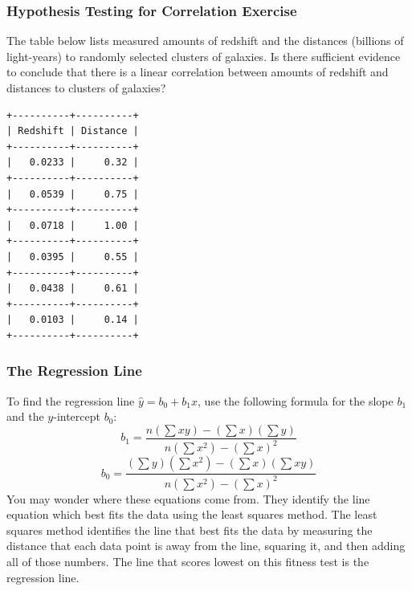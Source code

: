 \documentclass[xcolor=dvipsnames]{beamer}
\begin{document}
\begin{frame}[fragile]
  \frametitle{Hypothesis Testing for Correlation Exercise}
  {\ubung} The table below lists measured amounts of redshift and
  the distances (billions of light-years) to randomly selected
  clusters of galaxies. Is there sufficient evidence to conclude
  that there is a linear correlation between amounts of redshift
  and distances to clusters of galaxies?
  \begin{footnotesize}
\begin{verbatim}
+----------+----------+
| Redshift | Distance |
+----------+----------+
|   0.0233 |     0.32 |
+----------+----------+
|   0.0539 |     0.75 |
+----------+----------+
|   0.0718 |     1.00 |
+----------+----------+
|   0.0395 |     0.55 |
+----------+----------+
|   0.0438 |     0.61 |
+----------+----------+
|   0.0103 |     0.14 |
+----------+----------+
\end{verbatim}
  \end{footnotesize}
\end{frame}

\begin{frame}
  \frametitle{The Regression Line}
  To find the regression line $\hat{y}=b_{0}+b_{1}x$, use the
  following formula for the slope $b_{1}$ and the $y$-intercept
  $b_{0}$:
  \begin{equation}
    \label{eq:ohzashur}
    b_{1}=\frac{n\left(\sum{}xy\right)-\left(\sum{}x\right)\left(\sum{}y\right)}{n\left(\sum{}x^{2}\right)-\left(\sum{}x\right)^{2}}
  \end{equation}
  \begin{equation}
    \label{eq:xuothaba}
    b_{0}=\frac{\left(\sum{}y\right)\left(\sum{}x^{2}\right)-\left(\sum{}x\right)\left(\sum{}xy\right)}{n\left(\sum{}x^{2}\right)-\left(\sum{}x\right)^{2}}
  \end{equation}
 You may wonder where these equations come from. They identify the
 line equation which best fits the data using the \alert{least
   squares} method. The least squares method identifies the line
 that best fits the data by measuring the distance that each data
 point is away from the line, squaring it, and then adding all of
 those numbers. The line that scores lowest on this fitness test
 is the regression line.
\end{frame}
\end{document}
